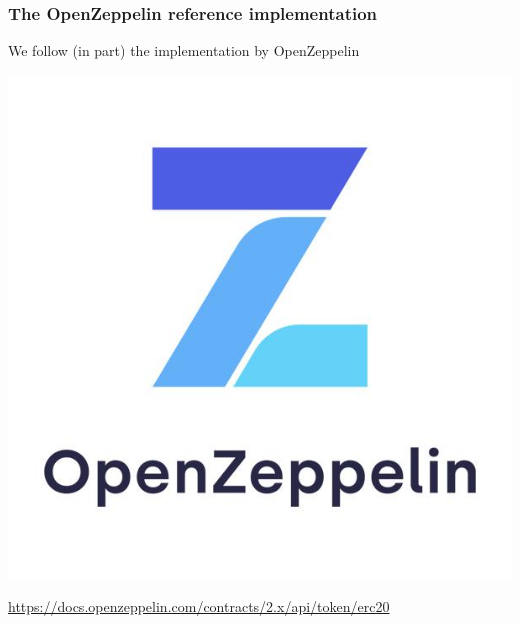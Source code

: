\documentclass[11pt]{beamer}  %
\begin{document}
\begin{frame}\frametitle{The OpenZeppelin reference implementation}

  \begin{greenbox}{We follow (in part) the implementation by OpenZeppelin}
    \begin{center}
      \includegraphics[scale=0.2,clip=false]{pictures/open-zeppelin.jpg}
    \end{center}
    \begin{center}
      \url{https://docs.openzeppelin.com/contracts/2.x/api/token/erc20}
    \end{center}
  \end{greenbox}
  
\end{frame}
\end{document}
